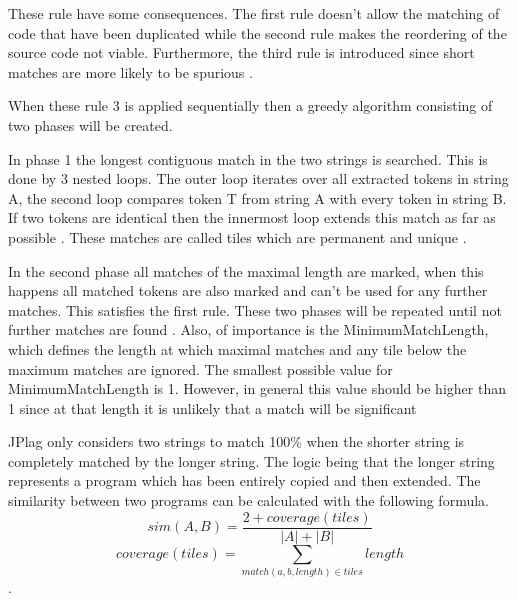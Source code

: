 \documentclass[a4paper, 11pt]{article}
\renewcommand{\\}{\vspace*{0.5\baselineskip} \newline}
\begin{document}
These rule have some consequences. The first rule doesn't allow the matching of code that have been duplicated while
the second rule makes the reordering of the source code not viable. Furthermore, the third rule is introduced since
short matches are more likely to be spurious \autocite[p. 11]{JPlagP}.

When these rule 3 is applied sequentially then a greedy algorithm consisting of two phases will be created.

In phase 1 the longest contiguous match in the two strings is searched. This is done by 3 nested loops. The outer loop iterates over all extracted
tokens in string A, the second loop compares token T from string A with every token in string B. If two tokens are identical then the innermost loop
extends this match as far as possible \autocite[p. 11]{JPlagP}. These matches are called tiles which are permanent and unique \autocite[p. 3]{GST}.

In the second phase all matches of the maximal length are marked, when this happens all matched tokens are also marked and can't be used for any
further matches. This satisfies the first rule. These two phases will be repeated until not further matches are found \autocite[p. 11]{JPlagP}.
Also, of importance is the MinimumMatchLength, which defines the length at which maximal matches and any tile below the maximum matches are ignored.
The smallest possible value for MinimumMatchLength is 1. However, in general this value should be higher than 1 since at that length it is unlikely
that a match will be significant \autocite[p. 3]{GST}

JPlag only considers two strings to match 100\% when the shorter string is completely matched by the longer string. The logic being that the longer string
represents a program which has been entirely copied and then extended. 
The similarity between two programs can be calculated with the following formula.
\[
	sim(A,B) = \frac{2+coverage(tiles)}{|A|+|B|}
\]
\[
	coverage(tiles) = \sum_{match(a,b,length)\in tiles} length
\]
\autocite[p. 13]{JPlagP}.
\end{document}
